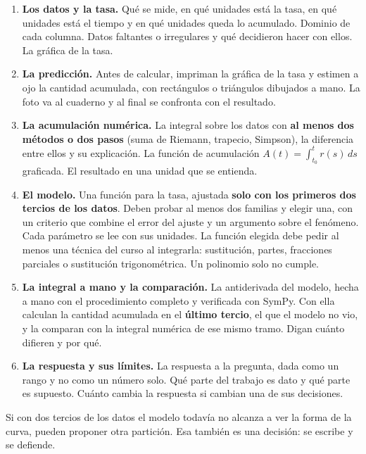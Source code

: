 \documentclass[12pt,letterpaper]{article}
\begin{document}
\begin{enumerate}[label=\textbf{P\arabic*.},leftmargin=2.6em,itemsep=0.5em]
    \item \textbf{Los datos y la tasa.} Qué se mide, en qué unidades está la tasa, en qué unidades está el tiempo y en qué unidades queda lo acumulado. Dominio de cada columna. Datos faltantes o irregulares y qué decidieron hacer con ellos. La gráfica de la tasa.
    \item \textbf{La predicción.} Antes de calcular, impriman la gráfica de la tasa y estimen a ojo la cantidad acumulada, con rectángulos o triángulos dibujados a mano. La foto va al cuaderno y al final se confronta con el resultado.
    \item \textbf{La acumulación numérica.} La integral sobre los datos con \textbf{al menos dos métodos o dos pasos} (suma de Riemann, trapecio, Simpson), la diferencia entre ellos y su explicación. La función de acumulación $A(t)=\int_{t_0}^{t} r(s)\,ds$ graficada. El resultado en una unidad que se entienda.
    \item \textbf{El modelo.} Una función para la tasa, ajustada \textbf{solo con los primeros dos tercios de los datos}. Deben probar al menos dos familias y elegir una, con un criterio que combine el error del ajuste y un argumento sobre el fenómeno. Cada parámetro se lee con sus unidades. La función elegida debe pedir al menos una técnica del curso al integrarla: sustitución, partes, fracciones parciales o sustitución trigonométrica. Un polinomio solo no cumple.
    \item \textbf{La integral a mano y la comparación.} La antiderivada del modelo, hecha a mano con el procedimiento completo y verificada con SymPy. Con ella calculan la cantidad acumulada en el \textbf{último tercio}, el que el modelo no vio, y la comparan con la integral numérica de ese mismo tramo. Digan cuánto difieren y por qué.
    \item \textbf{La respuesta y sus límites.} La respuesta a la pregunta, dada como un rango y no como un número solo. Qué parte del trabajo es dato y qué parte es supuesto. Cuánto cambia la respuesta si cambian una de sus decisiones.
\end{enumerate}

Si con dos tercios de los datos el modelo todavía no alcanza a ver la forma de la curva, pueden proponer otra partición. Esa también es una decisión: se escribe y se defiende.
\end{document}
